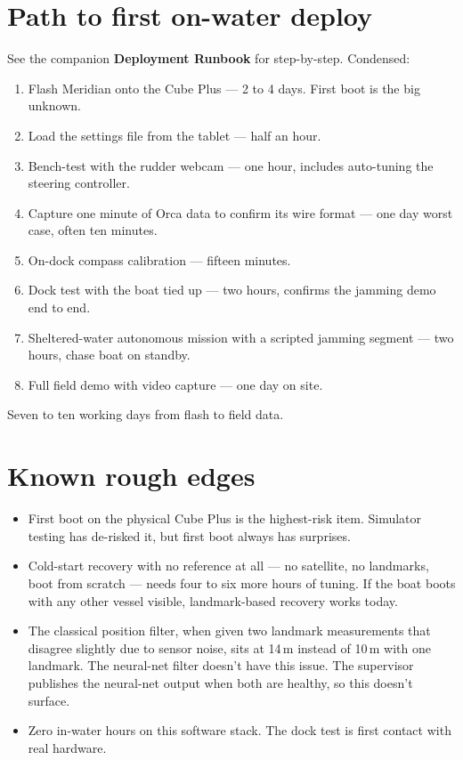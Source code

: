 \documentclass[10pt,a4paper]{article}
\begin{document}
\section{Path to first on-water deploy}

See the companion \textbf{Deployment Runbook} for step-by-step.
Condensed:

\begin{enumerate}
\item Flash Meridian onto the Cube Plus --- 2 to 4 days. First boot is the big unknown.
\item Load the settings file from the tablet --- half an hour.
\item Bench-test with the rudder webcam --- one hour, includes auto-tuning the steering controller.
\item Capture one minute of Orca data to confirm its wire format --- one day worst case, often ten minutes.
\item On-dock compass calibration --- fifteen minutes.
\item Dock test with the boat tied up --- two hours, confirms the jamming demo end to end.
\item Sheltered-water autonomous mission with a scripted jamming segment --- two hours, chase boat on standby.
\item Full field demo with video capture --- one day on site.
\end{enumerate}

Seven to ten working days from flash to field data.

\section{Known rough edges}

\begin{itemize}
\item First boot on the physical Cube Plus is the highest-risk item. Simulator testing has de-risked it, but first boot always has surprises.
\item Cold-start recovery with no reference at all --- no satellite, no landmarks, boot from scratch --- needs four to six more hours of tuning. If the boat boots with any other vessel visible, landmark-based recovery works today.
\item The classical position filter, when given two landmark measurements that disagree slightly due to sensor noise, sits at 14\,m instead of 10\,m with one landmark. The neural-net filter doesn't have this issue. The supervisor publishes the neural-net output when both are healthy, so this doesn't surface.
\item Zero in-water hours on this software stack. The dock test is first contact with real hardware.
\end{itemize}
\end{document}
